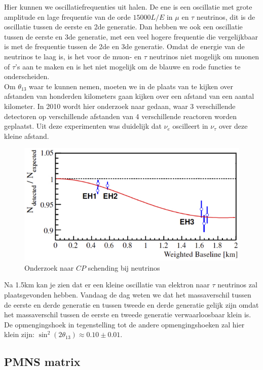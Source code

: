 \documentclass[../main.tex]{subfiles}
\begin{document}
Hier kunnen we oscillatiefrequenties uit halen. De ene is een oscillatie met grote amplitude en lage frequentie van de orde $15000L/E$ in $\mu$ en $\tau$ neutrinos, dit is de oscillatie tussen de eerste en 2de generatie. Dan hebben we ook een oscillatie tussen de eerste en 3de generatie, met een veel hogere frequentie die vergelijkbaar is met de frequentie tussen de 2de en 3de generatie. Omdat de energie van de neutrinos te laag is, is het voor de muon- en $\tau$ neutrinos niet mogelijk om muonen of $\tau$'s aan te maken en is het niet mogelijk om de blauwe en rode functies te onderscheiden.\\
Om $\theta_{13}$ waar te kunnen nemen, moeten we in de plaats van te kijken over afstanden van honderden kilometers gaan kijken over een afstand van een aantal kilometer. In 2010 wordt hier onderzoek naar gedaan, waar 3 verschillende detectoren op verschillende afstanden van 4 verschillende reactoren worden geplaatst. Uit deze experimenten was duidelijk dat $\nu_e$ oscilleert in $\nu_\tau$ over deze kleine afstand. 

\begin{figure}[h]
    \centering
    \includegraphics[width=0.6\linewidth]{neutrinos/1_3_oscillatie.png}
    \caption{Onderzoek naar $CP$ schending bij neutrinos}%
    \label{fig:neutrinos/1_3_oscillatie}
\end{figure}

Na 1.5km kan je zien dat er een kleine oscillatie van elektron naar $\tau$ neutrinos zal plaatsgevonden hebben. Vandaag de dag weten we dat het massaverschil tussen de eerste en derde generatie en tussen tweede en derde generatie gelijk zijn omdat het massaverschil tussen de eerste en tweede generatie verwaarloosbaar klein is. De opmengingshoek in tegenstelling tot de andere opmengingshoeken zal hier klein zijn: $\sin ^{2}\left(2 \theta_{13}\right) \approx 0.10 \pm 0.01$.

\subsection{PMNS matrix}%
\label{sub:pmns_matrix}
\end{document}

